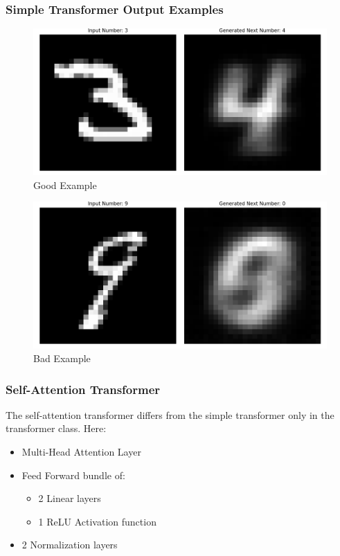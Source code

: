 \begin{frame}
    \frametitle{Simple Transformer Output Examples}
    \begin{figure}
        \centering
        \includegraphics[height=0.35\textheight]{media/3rdAssignment/Figure_3.png}
        \vspace{-0.35cm}
        \caption{Good Example}
    \end{figure}
    \vspace{-0.35cm}
    \begin{figure}
        \centering
        \includegraphics[height=0.35\textheight]{media/3rdAssignment/Figure_4.png}
        \vspace{-0.35cm}
        \caption{Bad Example}
    \end{figure}
\end{frame}

\begin{frame}
    \frametitle{Self-Attention Transformer}
    The self-attention transformer differs from the simple transformer only in
    the transformer class. Here:
    \begin{itemize}
        \item Multi-Head Attention Layer
        \item Feed Forward bundle of:
        \begin{itemize}
            \item 2 Linear layers
            \item 1 ReLU Activation function
        \end{itemize}
        \item 2 Normalization layers
    \end{itemize}
\end{frame}


